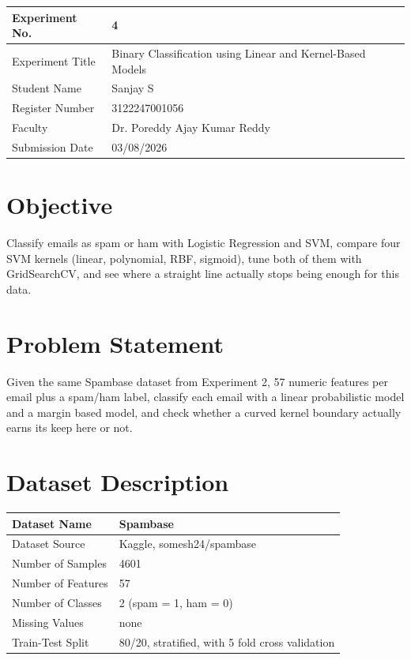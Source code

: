 \documentclass[12pt,a4paper]{article}
\begin{document}
\begin{tabular}{|p{4cm}|p{11cm}|}
\hline
Experiment No. & 4 \\ \hline
Experiment Title & Binary Classification using Linear and Kernel-Based Models\footnotemark \\ \hline
Student Name & Sanjay S \\ \hline
Register Number & 3122247001056 \\ \hline
Faculty & Dr. Poreddy Ajay Kumar Reddy \\ \hline
Submission Date & 03/08/2026 \\ \hline
\end{tabular}

\section{Objective}
Classify emails as spam or ham with Logistic Regression and SVM, compare four SVM kernels (linear,
polynomial, RBF, sigmoid), tune both of them with GridSearchCV, and see where a straight line actually
stops being enough for this data.

\section{Problem Statement}
Given the same Spambase dataset from Experiment 2, 57 numeric features per email plus a spam/ham
label, classify each email with a linear probabilistic model and a margin based model, and check
whether a curved kernel boundary actually earns its keep here or not.

\section{Dataset Description}
\begin{longtable}{|p{6cm}|p{8cm}|}
\hline
Dataset Name & Spambase \\ \hline
Dataset Source & Kaggle, somesh24/spambase \\ \hline
Number of Samples & 4601 \\ \hline
Number of Features & 57 \\ \hline
Number of Classes & 2 (spam = 1, ham = 0) \\ \hline
Missing Values & none \\ \hline
Train-Test Split & 80/20, stratified, with 5 fold cross validation \\ \hline
\end{longtable}
\end{document}
